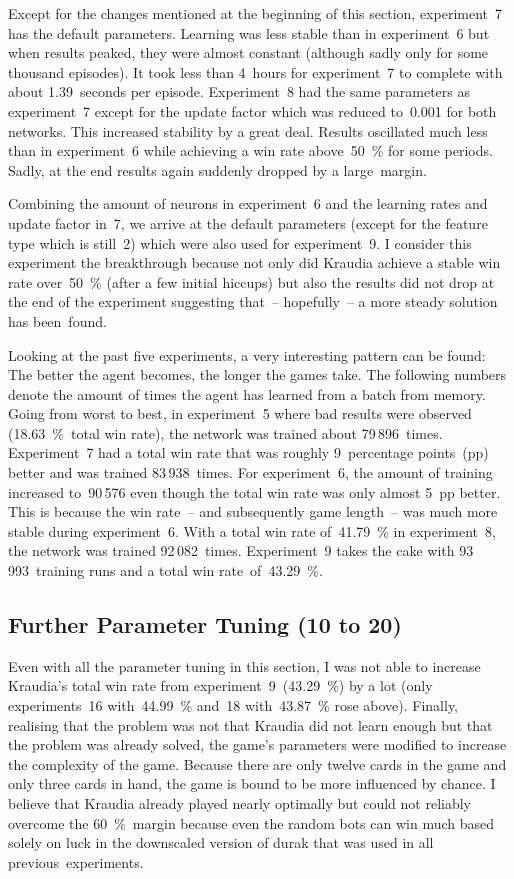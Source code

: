 \documentclass[a4paper,titlepage]{article}
\begin{document}
Except for the changes mentioned at the beginning of this section, experiment~7 has the default parameters. Learning was less stable than in experiment~6 but when results peaked, they were almost constant (although sadly only for some thousand episodes). It took less than 4~hours for experiment~7 to complete with about 1.39~seconds per episode. Experiment~8 had the same parameters as experiment~7 except for the update factor which was reduced to~0.001 for both networks. This increased stability by a great deal. Results oscillated much less than in experiment~6 while achieving a win rate above~50~\% for some periods. Sadly, at the end results again suddenly dropped by a large~margin.

Combining the amount of neurons in experiment~6 and the learning rates and update factor in~7, we arrive at the default parameters (except for the feature type which is still~2) which were also used for experiment~9. I consider this experiment the breakthrough because not only did Kraudia achieve a stable win rate over~50~\% (after a few initial hiccups) but also the results did not drop at the end of the experiment suggesting that~-- hopefully~-- a more steady solution has been~found. %
\medskip

Looking at the past five experiments, a very interesting pattern can be found: The better the agent becomes, the longer the games take. The following numbers denote the amount of times the agent has learned from a batch from memory. Going from worst to best, in experiment~5 where bad results were observed (18.63~\%~total win rate), the network was trained about 79\,896~times. Experiment~7 had a total win rate that was roughly 9~percentage points~(pp) better and was trained 83\,938~times. For experiment~6, the amount of training increased to~90\,576 even though the total win rate was only almost 5~pp better. This is because the win rate~-- and subsequently game length~-- was much more stable during experiment~6. With a total win rate of~41.79~\% in experiment~8, the network was trained 92\,082~times. Experiment~9 takes the cake with 93\,993~training runs and a total win rate~of~43.29~\%.

\subsection{Further Parameter Tuning (10 to 20)}

\medskip

Even with all the parameter tuning in this section, I was not able to increase Kraudia's total win rate from experiment~9~(43.29~\%) by a lot (only experiments~16 with~44.99~\% and~18 with~43.87~\% rose above). Finally, realising that the problem was not that Kraudia did not learn enough but that the problem was already solved, the game's parameters were modified to increase the complexity of the game. Because there are only twelve cards in the game and only three cards in hand, the game is bound to be more influenced by chance. I believe that Kraudia already played nearly optimally but could not reliably overcome the 60~\%~margin because even the random bots can win much based solely on luck in the downscaled version of durak that was used in all previous~experiments.
\end{document}
